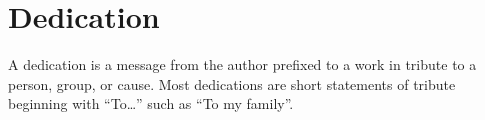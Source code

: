 \chapter{Dedication}
A dedication is a message from the author prefixed to a work in tribute to a
person, group, or cause. Most dedications are short statements of tribute
beginning with “To…” such as “To my family”.
